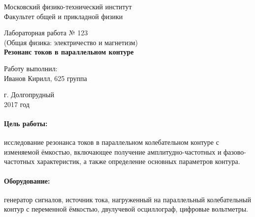 \documentclass[12pt]{kiarticle} %
\begin{document}
\begin{titlepage}
	\begin{center}
		\large 	Московский физико-технический институт \\
		Факультет общей и прикладной физики \\
		\vspace{0.2cm}
		
		\vspace{4.5cm}
		Лабораторная работа № 123 \\ \vspace{0.2cm}
		\large (Общая физика: электричество и магнетизм) \\ \vspace{0.2cm}
		\LARGE \textbf{Резонанс токов в параллельном контуре}
	\end{center}
	\vspace{2.3cm} \large
	
	\begin{center}
		Работу выполнил: \\
		Иванов Кирилл,
		625 группа
		\vspace{10mm}		
		
	\end{center}
	
	\begin{center} \vspace{60mm}
		г. Долгопрудный \\
		2017 год
	\end{center}
\end{titlepage}



\paragraph*{Цель работы:} исследование резонанса токов в параллельном колебательном контуре с изменяемой
ёмкостью, включающее получение амплитудно-частотных и фазово-частотных характеристик, а также определение основных параметров контура.

\paragraph*{Оборудование:} генератор сигналов, источник тока, нагруженный на параллельный колебательный контур с переменной ёмкостью, двулучевой осциллограф, цифровые вольтметры.
\end{document}
